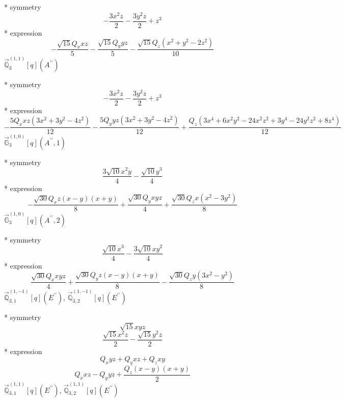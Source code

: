 \documentclass[fleqn,8pt]{jsarticle}
\begin{document}
\noindent\quad ** symmetry
\begin{dmath*}
- \frac{3 x^{2} z}{2} - \frac{3 y^{2} z}{2} + z^{3}
\end{dmath*}
\noindent\quad ** expression
\begin{dmath*}
- \frac{\sqrt{15} Q_{x} x z}{5} - \frac{\sqrt{15} Q_{y} y z}{5} - \frac{\sqrt{15} Q_{z} \left(x^{2} + y^{2} - 2 z^{2}\right)}{10}
\end{dmath*}
\noindent\quad $\vec{\mathbb{Q}}_{3}^{(1,1)}[q](A^{\prime\prime})$

\noindent\quad ** symmetry
\begin{dmath*}
- \frac{3 x^{2} z}{2} - \frac{3 y^{2} z}{2} + z^{3}
\end{dmath*}
\noindent\quad ** expression
\begin{dmath*}
- \frac{5 Q_{x} x z \left(3 x^{2} + 3 y^{2} - 4 z^{2}\right)}{12} - \frac{5 Q_{y} y z \left(3 x^{2} + 3 y^{2} - 4 z^{2}\right)}{12} + \frac{Q_{z} \left(3 x^{4} + 6 x^{2} y^{2} - 24 x^{2} z^{2} + 3 y^{4} - 24 y^{2} z^{2} + 8 z^{4}\right)}{12}
\end{dmath*}
\noindent\quad $\vec{\mathbb{G}}_{3}^{(1,0)}[q](A^{\prime\prime},1)$

\noindent\quad ** symmetry
\begin{dmath*}
\frac{3 \sqrt{10} x^{2} y}{4} - \frac{\sqrt{10} y^{3}}{4}
\end{dmath*}
\noindent\quad ** expression
\begin{dmath*}
- \frac{\sqrt{30} Q_{x} z \left(x - y\right) \left(x + y\right)}{8} + \frac{\sqrt{30} Q_{y} x y z}{4} + \frac{\sqrt{30} Q_{z} x \left(x^{2} - 3 y^{2}\right)}{8}
\end{dmath*}
\noindent\quad $\vec{\mathbb{G}}_{3}^{(1,0)}[q](A^{\prime\prime},2)$

\noindent\quad ** symmetry
\begin{dmath*}
\frac{\sqrt{10} x^{3}}{4} - \frac{3 \sqrt{10} x y^{2}}{4}
\end{dmath*}
\noindent\quad ** expression
\begin{dmath*}
\frac{\sqrt{30} Q_{x} x y z}{4} + \frac{\sqrt{30} Q_{y} z \left(x - y\right) \left(x + y\right)}{8} - \frac{\sqrt{30} Q_{z} y \left(3 x^{2} - y^{2}\right)}{8}
\end{dmath*}
\noindent\quad $\vec{\mathbb{Q}}_{3,1}^{(1,-1)}[q](E^{\prime\prime})$, $\vec{\mathbb{Q}}_{3,2}^{(1,-1)}[q](E^{\prime\prime})$

\noindent\quad ** symmetry
\begin{dmath*}
\sqrt{15} x y z
\end{dmath*}
\begin{dmath*}
\frac{\sqrt{15} x^{2} z}{2} - \frac{\sqrt{15} y^{2} z}{2}
\end{dmath*}
\noindent\quad ** expression
\begin{dmath*}
Q_{x} y z + Q_{y} x z + Q_{z} x y
\end{dmath*}
\begin{dmath*}
Q_{x} x z - Q_{y} y z + \frac{Q_{z} \left(x - y\right) \left(x + y\right)}{2}
\end{dmath*}
\noindent\quad $\vec{\mathbb{Q}}_{3,1}^{(1,1)}[q](E^{\prime\prime})$, $\vec{\mathbb{Q}}_{3,2}^{(1,1)}[q](E^{\prime\prime})$
\end{document}
